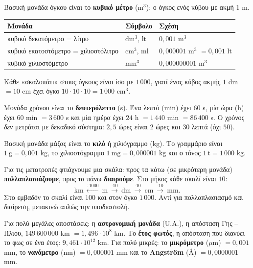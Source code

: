 
Βασική μονάδα όγκου είναι το \textbf{κυβικό μέτρο} (m$^3$): ο όγκος ενός κύβου με ακμή $1$ m.
\begin{center}
\renewcommand{\arraystretch}{1.4}
\begin{tabular}{@{}lll@{}}
\toprule
\textbf{Μονάδα} & \textbf{Σύμβολο} & \textbf{Σχέση}\\
\midrule
κυβικό δεκατόμετρο = λίτρο & dm$^3$, lt & $0{,}001$ m$^3$\\
κυβικό εκατοστόμετρο = χιλιοστόλιτρο & cm$^3$, ml & $0{,}000001$ m$^3$ $=0{,}001$ lt\\
κυβικό χιλιοστόμετρο & mm$^3$ & $0{,}000000001$ m$^3$\\
\bottomrule
\end{tabular}
\end{center}
Κάθε «σκαλοπάτι» στους όγκους είναι ίσο με \textbf{$1\,000$}, γιατί ένας κύβος ακμής $1$ dm $=10$ cm έχει όγκο $10\cdot10\cdot10=1\,000$ cm$^3$.


Μονάδα χρόνου είναι το \textbf{δευτερόλεπτο} (s). Ένα λεπτό (min) έχει $60$ s, μία ώρα (h) έχει $60$ min $=3\,600$ s και μία ημέρα έχει $24$ h $=1\,440$ min $=86\,400$ s. Ο χρόνος \emph{δεν} μετράται με δεκαδικό σύστημα: $2{,}5$ ώρες είναι $2$ ώρες και $30$ λεπτά (όχι $50$).

Βασική μονάδα μάζας είναι το \textbf{κιλό} ή χιλιόγραμμο (kg). Το γραμμάριο είναι $1\ \mathrm{g}=0{,}001$ kg, το χιλιοστόγραμμο $1\ \mathrm{mg}=0{,}000001$ kg και ο τόνος $1\ \mathrm{t}=1\,000$ kg.


Για τις μετατροπές φτιάχνουμε μια σκάλα: προς τα κάτω (σε μικρότερη μονάδα) \textbf{πολλαπλασιάζουμε}, προς τα πάνω \textbf{διαιρούμε}. Στο μήκος κάθε σκαλί είναι $10$:
$$\mathrm{km}\ \xleftarrow{:1000}\ \mathrm{m}\ \xrightarrow{\cdot10}\ \mathrm{dm}\ \xrightarrow{\cdot10}\ \mathrm{cm}\ \xrightarrow{\cdot10}\ \mathrm{mm}.$$
Στο εμβαδόν το σκαλί είναι $100$ και στον όγκο $1\,000$. Αντί για πολλαπλασιασμό και διαίρεση, μετακινώ απλώς την υποδιαστολή.


Για πολύ μεγάλες αποστάσεις: η \textbf{αστρονομική μονάδα} (U.A.), η απόσταση Γης -- Ήλιου, $149\,600\,000$ km $=1{,}496\cdot10^8$ km. Το \textbf{έτος φωτός}, η απόσταση που διανύει το φως σε ένα έτος: $9{,}461\cdot10^{12}$ km. Για πολύ μικρές: το \textbf{μικρόμετρο} ($\mu$m) $=0{,}001$ mm, το \textbf{νανόμετρο} (nm) $=0{,}000001$ mm και το \textbf{Angström} (Å) $=0{,}0000001$ mm.

